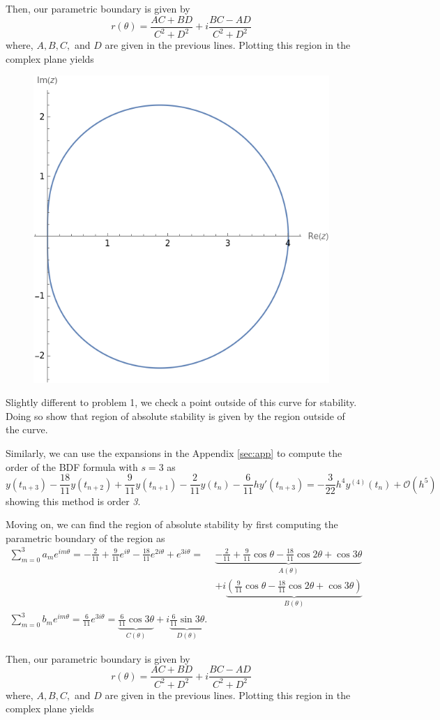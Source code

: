 \documentclass[a4paper,12pt]{article}
\newcommand{\bigO}{\mathcal{O}}
\begin{document}
\begin{enumerate}[label = (\arabic*)]
	Then, our parametric boundary is given by 
	\[
	r(\theta) = \frac{AC + BD}{C^2 + D^2} + i \frac{BC - AD}{C^2 + D^2}
	\]
	where, $ A, B, C, $ and $ D $ are given in the previous lines. Plotting this region in the complex plane yields
	
	\begin{figure}[h]
		\centering
		\includegraphics[width = 0.4 \textwidth]{Images/BDF2.png}
	\end{figure}

	Slightly different to problem 1, we check a point outside of this curve for stability. Doing so show that region of absolute stability is given by the region outside of the curve.
	
	\newpage
	Similarly, we can use the expansions in the Appendix \ref*{sec:app} to compute the order of the BDF formula with $ s = 3 $ as 
	\[
		y(t_{n + 3}) - \frac{18}{11} y(t_{n + 2}) + \frac{9}{11} y(t_{n + 1}) - \frac{2}{11} y(t_n) - \frac{6}{11} h y'(t_{n + 3}) = -\frac{3}{22} h^4 y^{(4)}(t_n) + \bigO(h^5)
	\]
	showing this method is order \emph{3}.
	
	Moving on, we can find the region of absolute stability by first computing the parametric boundary of the region as
	\begin{align*}
		\sum_{m = 0}^{3} a_m e^{i m \theta} = -\frac{2}{11} + \frac{9}{11} e^{i \theta} - \frac{18}{11} e^{2 i \theta} + e^{3 i \theta} =& \underbrace{-\frac{2}{11} + \frac{9}{11} \cos \theta - \frac{18}{11} \cos 2\theta + \cos 3\theta}_{A(\theta)} \\
		&+ i \underbrace{\left(\frac{9}{11} \cos \theta - \frac{18}{11} \cos 2\theta + \cos 3\theta\right)}_{B(\theta)} \\
		\sum_{m = 0}^{3} b_m e^{i m \theta} = \frac{6}{11} e^{3i \theta} = \underbrace{\frac{6}{11} \cos 3\theta}_{C(\theta)} + i \underbrace{\frac{6}{11} \sin 3\theta}_{D(\theta)}.
	\end{align*}
	
	Then, our parametric boundary is given by 
	\[
	r(\theta) = \frac{AC + BD}{C^2 + D^2} + i \frac{BC - AD}{C^2 + D^2}
	\]
	where, $ A, B, C, $ and $ D $ are given in the previous lines. Plotting this region in the complex plane yields
	

\end{enumerate}
\end{document}
